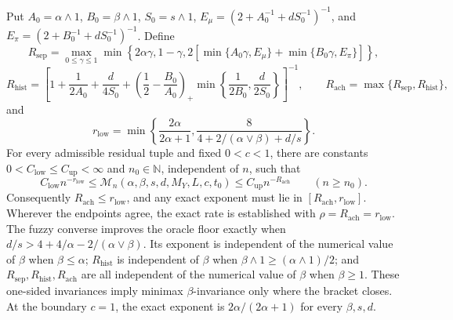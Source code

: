 Put \(A_0=\alpha\wedge1\), \(B_0=\beta\wedge1\), \(S_0=s\wedge1\), \(E_\mu=(2+A_0^{-1}+dS_0^{-1})^{-1}\), and \(E_\pi=(2+B_0^{-1}+dS_0^{-1})^{-1}\). Define
\[
R_{\mathrm{sep}}=\max_{0\le\gamma\le1}\min\left\{2\alpha\gamma,1-\gamma,2\left[\min\{A_0\gamma,E_\mu\}+\min\{B_0\gamma,E_\pi\}\right]\right\},
\]
\[
R_{\mathrm{hist}}=\left[1+\frac1{2A_0}+\frac d{4S_0}+\left(\frac12-\frac{B_0}{A_0}\right)_+\min\left\{\frac1{2B_0},\frac d{2S_0}\right\}\right]^{-1},
\qquad R_{\mathrm{ach}}=\max\{R_{\mathrm{sep}},R_{\mathrm{hist}}\},
\]
and
\[
r_{\mathrm{low}}=\min\left\{\frac{2\alpha}{2\alpha+1},\frac{8}{4+2/(\alpha\vee\beta)+d/s}\right\}.
\]
For every admissible residual tuple and fixed \(0<c<1\), there are constants \(0<C_{\mathrm{low}}\le C_{\mathrm{up}}<\infty\) and \(n_0\in\mathbb N\), independent of \(n\), such that
\[
C_{\mathrm{low}}n^{-r_{\mathrm{low}}}\le\mathcal M_n(\alpha,\beta,s,d,M_Y,L,c,t_0)\le C_{\mathrm{up}}n^{-R_{\mathrm{ach}}}
\qquad(n\ge n_0).
\]
Consequently \(R_{\mathrm{ach}}\le r_{\mathrm{low}}\), and any exact exponent must lie in \([R_{\mathrm{ach}},r_{\mathrm{low}}]\). Wherever the endpoints agree, the exact rate is established with \(\rho=R_{\mathrm{ach}}=r_{\mathrm{low}}\). The fuzzy converse improves the oracle floor exactly when \(d/s>4+4/\alpha-2/(\alpha\vee\beta)\). Its exponent is independent of the numerical value of \(\beta\) when \(\beta\le\alpha\); \(R_{\mathrm{hist}}\) is independent of \(\beta\) when \(\beta\wedge1\ge(\alpha\wedge1)/2\); and \(R_{\mathrm{sep}},R_{\mathrm{hist}},R_{\mathrm{ach}}\) are all independent of the numerical value of \(\beta\) when \(\beta\ge1\). These one-sided invariances imply minimax \(\beta\)-invariance only where the bracket closes. At the boundary \(c=1\), the exact exponent is \(2\alpha/(2\alpha+1)\) for every \(\beta,s,d\).